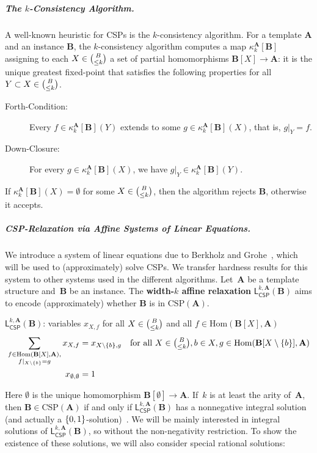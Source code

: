 \documentclass[a4paper,english, thm-restate]{lipics-v2021}
\newcommand{\defining}[1]{\textbf{#1}}
\DeclarePairedDelimiter\set{\lbrace}{\rbrace}
\newcommand{\StructA}{\mathbf{A}}
\newcommand{\StructB}{\mathbf{B}}
\newcommand{\CSP}[1]{\mathrm{CSP}(#1)}
\newcommand{\kcol}[3]{\kappa_{#1}^{#2}[#3]}
\newcommand{\restrict}[2]{#1|_{#2}}
\newcommand{\Hom}[2]{\mathrm{Hom}(#1,#2)}
\newcommand{\leqs}{\mathsf{L}}
\newcommand{\cspiso}[3]{\leqs^{#1,#2}_{\mathsf{CSP}}(#3)}
\begin{document}
	
	\subparagraph{The $k$-Consistency Algorithm.}
	A well-known heuristic for CSPs is the $k$-consistency algorithm.
	For a template $\StructA$ and an instance $\StructB$,
	the $k$-consistency algorithm computes a map $\kcol{k}{\StructA}{\StructB}$ assigning to each $X \in \tbinom{B} {\leq k}$
	a set of partial homomorphisms $\StructB[X] \to \StructA$:
	it is the unique greatest fixed-point that satisfies
	the following properties for all  $Y \subset X \in \tbinom{B} {\leq k}$. 
	\begin{description}
		\item[Forth-Condition:]Every $f \in \kcol{k}{\StructA}{\StructB}(Y)$
		extends to some $g \in \kcol{k}{\StructA}{\StructB}(X)$,
		that is, $\restrict{g}{Y}=f$.
		\item[Down-Closure:] For every $g \in \kcol{k}{\StructA}{\StructB}(X)$,
		we have $\restrict{g}{Y} \in \kcol{k}{\StructA}{\StructB}(Y)$.
	\end{description}
	If $\kcol{k}{\StructA}{\StructB}(X) = \emptyset$
	for some $X \in \tbinom{B} {\leq k}$, then the algorithm rejects $\StructB$,
	otherwise it accepts.


	
	
	
	\subparagraph{CSP-Relaxation via Affine Systems of Linear Equations.}
	We introduce a system of linear equations due to Berkholz and Grohe~\cite{BerkholzGrohe2015},
	which will be used to (approximately) solve CSPs.
	We transfer hardness results for this system
	to other systems used in the different algorithms.
	Let~$\StructA$ be a template structure and~$\StructB$ be an instance.
	The \defining{width-$k$ affine relaxation} $\cspiso{k}{\StructA}{\StructB}$
	aims to encode (approximately) whether $\StructB$ is in $\CSP{\StructA}$. 
	\begin{systembox}{$\cspiso{k}{\StructA}{\StructB}$: variables $x_{X,f}$
			for all $X \in \tbinom{B}{\leq k}$ and all $f \in  \Hom{\StructB[X]}{\StructA}$}
		\begin{align*}
			\sum_{\substack{f \in \Hom{\StructB[X]}{\StructA},\\ \restrict{f}{X\setminus\set{b}} = g}} x_{X,f} &=  x_{X\setminus{\set{b}},g}  &\text{for all } X \in \tbinom{B}{\leq k}, b \in X, g \in \Hom{\StructB[X\setminus\set{b}]}{\StructA} \\
			x_{\emptyset,\emptyset }&= 1
		\end{align*}
	\end{systembox}
	\noindent Here $\emptyset$ is the unique homomorphism $\StructB[\emptyset] \to \StructA$.
	If~$k$ is at least the arity of~$\StructA$, then
	$\StructB \in \CSP{\StructA}$ if and only if $\cspiso{k}{\StructA}{\StructB}$
	has a nonnegative integral solution (and actually a $\set{0,1}$-solution)~\cite{BerkholzGrohe2015}.
	We will be mainly interested in
	integral solutions of $\cspiso{k}{\StructA}{\StructB}$,
	so without the non-negativity restriction.
	To show the existence of these solutions,
	we will also consider special rational solutions:
	
\end{document}

